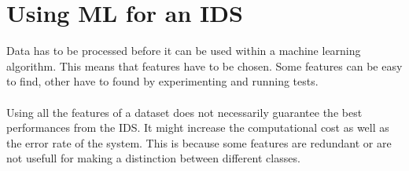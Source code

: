\section{Using ML for an IDS}
Data has to be processed before it can be used within a machine learning algorithm. This means that features have to be chosen. Some features can be easy to find, other have to found by experimenting and running tests. \\
\\
Using all the features of a dataset does not necessarily guarantee the best
performances from the IDS. It might increase the computational cost as well as the
error rate of the system. This is because some features are redundant or are not usefull for making a distinction between different classes. \cite{al2014machine}
